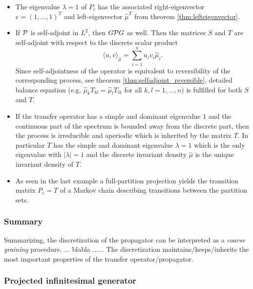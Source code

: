 \begin{itemize}
\item The eigenvalue $\lambda = 1$ of $P_c$ has the associated right-eigenvector $e = (1,\dots,1)^T$ and left-eigenvector $\hat{\mu}^T$ from theorem \ref{thm:lefteigenvector}.
\item If $\mathcal{P}$ is self-adjoint in $L^2$, then $G\mathcal{P} G$ as well. Then the matrices $S$ and $T$ are self-adjoint with respect to the discrete scalar product 
\begin{equation*}
\langle u, v \rangle_{\hat{\mu}} = \sum_{i=1}^n u_i v_i \hat{\mu}_i.
\end{equation*}
Since self-adjointness of the operator is equivalent to reversibility of the corresponding process, see theorem \ref{thm:selfadjoint_reversible}, detailed balance equation (e.g. $\hat{\mu}_k T_{kl} = \hat{\mu}_l T_{lk}$ for all $k,l =1,\dots, n$) is fulfilled for both $S$ and $T$.
\item If the transfer operator has a simple and dominant eigenvalue $1$ and the continuous part of the spectrum is bounded away from the discrete part, then the process is irreducible and aperiodic which is inherited by the matrix $T$. In particular $T$ has the simple and dominant eigenvalue $\lambda=1$ which is the only eigenvalue with $|\lambda|=1$ and the discrete invariant density $\hat{\mu}$ is the unique invariant density of $T$.
\item As seen in the last example a full-partition projection yields the transition matrix $P_c=T$ of a Markov chain describing transitions between the partition sets.
\end{itemize}

\subsubsection*{Summary}
Summarizing, the discretization of the propagator can be interpreted as a \textit{coarse graining} procedure.
... blabla ......
The discretization maintains/keeps/inherits the most important properties of the transfer operator/propagator.

\subsubsection*{Projected infinitesimal generator}

